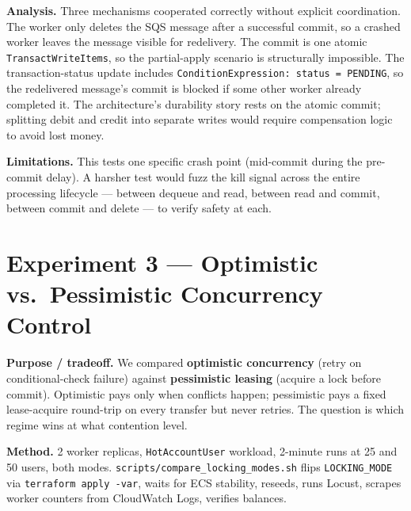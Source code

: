 \documentclass[10pt,a4paper]{article}
\begin{document}
\begin{analysisbox}
\textbf{Analysis.} Three mechanisms cooperated correctly without explicit coordination. The worker only deletes the SQS message after a successful commit, so a crashed worker leaves the message visible for redelivery. The commit is one atomic \texttt{TransactWriteItems}, so the partial-apply scenario is structurally impossible. The transaction-status update includes \texttt{ConditionExpression: status = PENDING}, so the redelivered message's commit is blocked if some other worker already completed it. The architecture's durability story rests on the atomic commit; splitting debit and credit into separate writes would require compensation logic to avoid lost money.
\end{analysisbox}

\begin{limitbox}
\textbf{Limitations.} This tests one specific crash point (mid-commit during the pre-commit delay). A harsher test would fuzz the kill signal across the entire processing lifecycle --- between dequeue and read, between read and commit, between commit and delete --- to verify safety at each.
\end{limitbox}

\section{Experiment 3 --- Optimistic vs.\ Pessimistic Concurrency Control}

\begin{purposebox}
\textbf{Purpose / tradeoff.} We compared \textbf{optimistic concurrency} (retry on conditional-check failure) against \textbf{pessimistic leasing} (acquire a lock before commit). Optimistic pays only when conflicts happen; pessimistic pays a fixed lease-acquire round-trip on every transfer but never retries. The question is which regime wins at what contention level.
\end{purposebox}

\textbf{Method.} 2 worker replicas, \texttt{HotAccountUser} workload, 2-minute runs at 25 and 50 users, both modes. \texttt{scripts/compare\_locking\_modes.sh} flips \texttt{LOCKING\_MODE} via \texttt{terraform apply -var}, waits for ECS stability, reseeds, runs Locust, scrapes worker counters from CloudWatch Logs, verifies balances.
\end{document}

